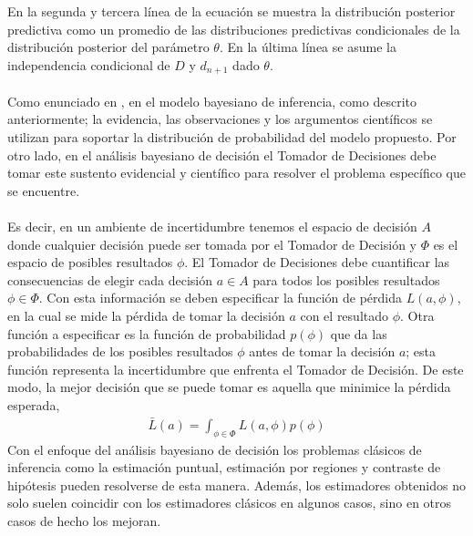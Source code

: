 En la segunda y tercera l\'inea de la ecuaci\'on se muestra la distribuci\'on posterior predictiva como un promedio de las distribuciones predictivas condicionales de la distribuci\'on posterior del par\'ametro $\theta$. En la \'ultima l\'inea se asume la independencia condicional de $D$ y $d_{n+1}$ dado $\theta$.\\
\\
Como enunciado en \cite{smith2010bayesian}, en el modelo bayesiano de inferencia, como descrito anteriormente; la evidencia, las observaciones y los argumentos cient\'ificos se utilizan para soportar la distribuci\'on de probabilidad del modelo propuesto. Por otro lado, en el an\'alisis bayesiano de decisi\'on el Tomador de Decisiones debe tomar este sustento evidencial y cient\'ifico para resolver el problema espec\'ifico que se encuentre.\\
\\
Es decir, en un ambiente de incertidumbre tenemos el espacio de decisi\'on $A$ donde cualquier decisi\'on puede ser tomada por el Tomador de Decisi\'on y $\Phi$ es el espacio de posibles resultados $\phi$. El Tomador de Decisiones debe cuantificar las consecuencias de elegir cada decisi\'on $a \in A$ para todos los posibles resultados $\phi \in \Phi$. Con esta informaci\'on se deben especificar la funci\'on de p\'erdida $L(a,\phi)$, en la cual se mide la p\'erdida de tomar la decisi\'on $a$ con el resultado $\phi$. Otra funci\'on a especificar es la funci\'on de probabilidad $p(\phi)$ que da las probabilidades de los posibles resultados $\phi$ antes de tomar la decisi\'on $a$; esta funci\'on representa la incertidumbre que enfrenta el Tomador de Decisi\'on. De este modo, la mejor decisi\'on que se puede tomar es aquella que minimice la p\'erdida esperada,
\begin{align*}
\bar{L}(a)= \int_{\phi \in \Phi} L(a,\phi)p(\phi)
\end{align*}
Con el enfoque del an\'alisis bayesiano de decisi\'on los problemas cl\'asicos de inferencia como la estimaci\'on puntual, estimaci\'on por regiones y contraste de hip\'otesis pueden resolverse de esta manera. Adem\'as, los estimadores obtenidos no solo suelen coincidir con los estimadores cl\'asicos en algunos casos, sino en otros casos de hecho los mejoran.